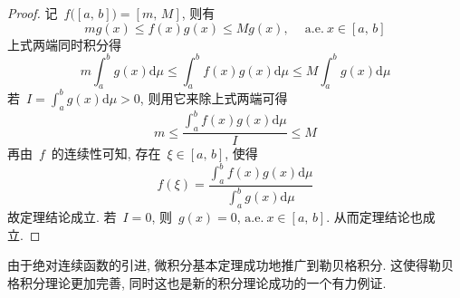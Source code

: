 \begin{proof}
记~$f\big([a,\,b]\big) = [m,\,M]$, 则有
\[
mg(x) \leqslant f(x)g(x) \leqslant Mg(x), \quad \mathrm{~a.e.~} x \in [a,\,b]
\]
上式两端同时积分得
\[
m\int_a^b g(x) \mathrm{d} \mu \leqslant \int_a^b f(x)g(x) \mathrm{d} \mu \leqslant M \int_a^b g(x) \mathrm{d} \mu
\]
若~$I=\int_a^b g(x) \mathrm{d} \mu > 0$, 则用它来除上式两端可得
\[
m \leqslant \frac{\int_a^b f(x)g(x) \mathrm{d} \mu}{I} \leqslant M
\]
再由~$f$~的连续性可知, 存在~$\xi \in [a,\,b]$, 使得
\[
f(\xi)=\frac{\int_a^b f(x)g(x) \mathrm{d} \mu}{\int_a^b g(x) \mathrm{d} \mu}
\]
故定理结论成立. 若~$I=0$, 则~$g(x)=0,\,\mathrm{a.e.~} x\in [a,\,b]$. 从而定理结论也成立.
\end{proof}

由于绝对连续函数的引进, 微积分基本定理成功地推广到勒贝格积分. 这使得勒贝格积分理论更加完善,  同时这也是新的积分理论成功的一个有力例证.

